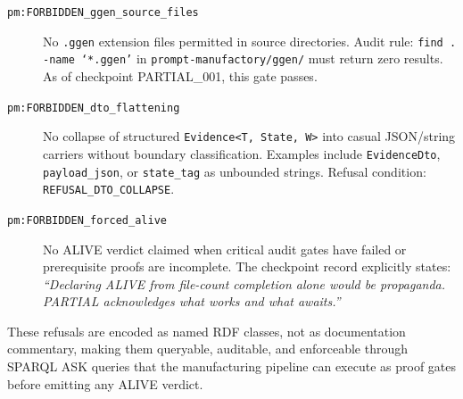 \begin{description}
  \item[\texttt{pm:FORBIDDEN\_ggen\_source\_files}] No \texttt{.ggen} extension files
    permitted in source directories. Audit rule: \texttt{find . -name `*.ggen'} in
    \texttt{prompt-manufactory/ggen/} must return zero results. As of checkpoint
    PARTIAL\_001, this gate passes.

  \item[\texttt{pm:FORBIDDEN\_dto\_flattening}] No collapse of structured
    \texttt{Evidence<T, State, W>} into casual JSON/string carriers without boundary
    classification. Examples include \texttt{EvidenceDto}, \texttt{payload\_json}, or
    \texttt{state\_tag} as unbounded strings. Refusal condition:
    \texttt{REFUSAL\_DTO\_COLLAPSE}.

  \item[\texttt{pm:FORBIDDEN\_forced\_alive}] No ALIVE verdict claimed when critical
    audit gates have failed or prerequisite proofs are incomplete. The checkpoint record
    explicitly states: \textit{``Declaring ALIVE from file-count completion alone would be
    propaganda. PARTIAL acknowledges what works and what awaits.''}
\end{description}

These refusals are encoded as named RDF classes, not as documentation commentary, making
them queryable, auditable, and enforceable through SPARQL ASK queries that the manufacturing
pipeline can execute as proof gates before emitting any ALIVE verdict.

